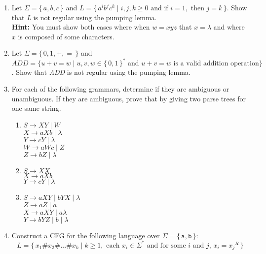 \documentclass[11pt, article, oneside]{memoir}
\newcommand{\set}[1]{\{\, #1\, \}}
\begin{document}
\begin{enumerate}
    
    \item
        Let \(\Sigma = \set{a, b, c}\) and \(L = \set{ {a^i}{b^j}{c^k} \mid i, j, k \ge 0 \text{ and if } i = 1,  \text{ then } j = k}\). Show that \textit{L} is not regular using the pumping lemma.
        \\\textbf{Hint:} You must show both cases where when \(w = xyz\) that \(x = \lambda\) and where \(x\) is composed of some characters.
    \item 
        Let \(\Sigma = \set{0, 1, +, =}\) and \(ADD = \{ u+v=w \mid u, v, w \in \set{0, 1}^* \text{ and } u+v=w \text{ is a valid addition operation}\}\). Show that \textit{ADD} is not regular using the pumping lemma.
    \item
        For each of the following grammars, determine if they are ambiguous or unambiguous. If they are ambiguous, prove that by giving two parse trees for one same string.
        \begin{enumerate}
            \item
                \(S \rightarrow XY \mid W \)
                \\\(X \rightarrow aXb \mid \lambda\)
                \\\(Y \rightarrow cY \mid \lambda\)
                \\\(W \rightarrow aWc \mid Z\)
                \\\(Z \rightarrow bZ \mid \lambda\)
            \item
                \(S \rightarrow XX \)
                \\\(X \rightarrow aXb\)
                \\\(Y \rightarrow cY \mid \lambda\)
            \item
                \(S \rightarrow aXY \mid bYX \mid \lambda \)
                \\\(Z \rightarrow aZ \mid a\)
                \\\(X \rightarrow aXY \mid a \lambda\)
                \\\(Y \rightarrow bYZ \mid b \mid \lambda\) 
        \end{enumerate}
    \item
        Construct a CFG for the following language over \(\Sigma = \set{\texttt{a}, \texttt{b}}\):
        \[
            L = \set{x_1\#x_2\#...\#x_k \mid k \ge 1, \text{ each } x_i \in \Sigma^* \text{ and for some } i \text{ and } j \text{, } x_i = {x_j}^R}
        \]    
\end{enumerate}
\end{document}
